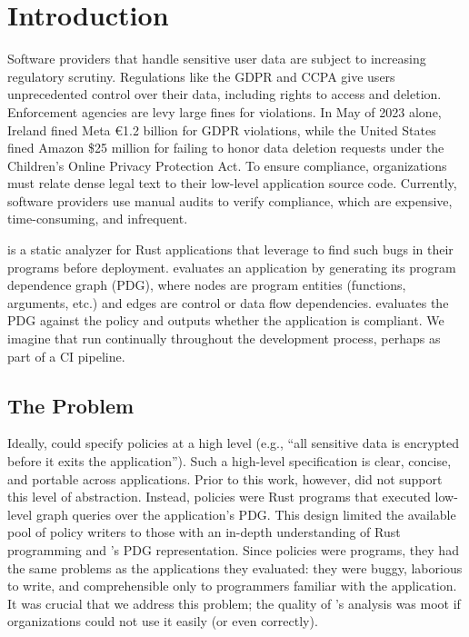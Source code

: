 \chapter{Introduction}
\label{sec:intro}

Software providers that handle sensitive user data are subject to increasing regulatory scrutiny.
%
Regulations like the GDPR and CCPA give users unprecedented control over their data, including rights to access and deletion.
%
Enforcement agencies are levy large fines for violations.
%
In May of 2023 alone, Ireland fined Meta €1.2 billion for GDPR violations, 
while the United States fined Amazon \$25 million for failing to honor data deletion requests under the Children’s Online Privacy Protection Act.\cite{todo}
To ensure compliance, organizations must relate dense legal text to their low-level application source code.
%
Currently, software providers use manual audits to verify compliance, which are expensive, time-consuming,
and infrequent.~\cite{todo}

\sys{} is a static analyzer for Rust applications that \devs{} leverage to find such bugs in their programs before deployment.
%
\sys{} evaluates an application by generating its program dependence graph (PDG), 
where nodes are program entities (functions, arguments, etc.) and edges are control or data flow dependencies.
%
\sys{} evaluates the PDG against the policy and outputs whether the application is compliant.
%
We imagine that \devs{} run \sys{} continually throughout the development process, perhaps as part of a CI pipeline.

\section{The Problem}
Ideally, \writers{} could specify policies at a high level (e.g., ``all sensitive data is encrypted before it exits the application'').
%
Such a high-level specification is clear, concise, and portable across applications.
%
Prior to this work, however, \sys{} did not support this level of abstraction.
%
Instead, policies were Rust programs that executed low-level graph queries over the application's PDG.
%
This design limited the available pool of policy writers to those with an in-depth understanding of Rust programming and \sys{}'s PDG representation.
%
Since policies were programs, they had the same problems as the applications they evaluated: 
they were buggy, laborious to write, and comprehensible only to programmers familiar with the application.
%
It was crucial that we address this problem; the quality of \sys's analysis was moot if organizations could not use it easily (or even correctly).

